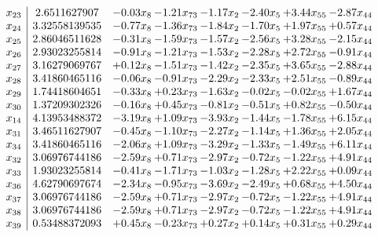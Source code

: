 \documentclass[8pt]{article}
\begin{document}
\[\begin{array}{c| c c@{\hskip 2pt} c@{\hskip 2pt} c@{\hskip 2pt} c@{\hskip 2pt} c@{\hskip 2pt} c@{\hskip 2pt} }
 x_{23}   &  2.6511627907 & -0.03 x_{8} & -1.21 x_{73} & -1.17 x_{2} & -2.40 x_{5} & +  3.44 x_{55} & -2.87 x_{44}\\
 x_{24}   &  3.32558139535 & -0.77 x_{8} & -1.36 x_{73} & -1.84 x_{2} & -1.70 x_{5} & +  1.97 x_{55} & +  0.57 x_{44}\\
 x_{25}   &  2.86046511628 & -0.31 x_{8} & -1.59 x_{73} & -1.57 x_{2} & -2.56 x_{5} & +  3.28 x_{55} & -2.15 x_{44}\\
 x_{26}   &  2.93023255814 & -0.91 x_{8} & -1.21 x_{73} & -1.53 x_{2} & -2.28 x_{5} & +  2.72 x_{55} & -0.91 x_{44}\\
 x_{27}   &  3.16279069767 & +  0.12 x_{8} & -1.51 x_{73} & -1.42 x_{2} & -2.35 x_{5} & +  3.65 x_{55} & -2.88 x_{44}\\
 x_{28}   &  3.41860465116 & -0.06 x_{8} & -0.91 x_{73} & -2.29 x_{2} & -2.33 x_{5} & +  2.51 x_{55} & -0.89 x_{44}\\
 x_{29}   &  1.74418604651 & -0.33 x_{8} & +  0.23 x_{73} & -1.63 x_{2} & -0.02 x_{5} & -0.02 x_{55} & +  1.67 x_{44}\\
 x_{30}   &  1.37209302326 & -0.16 x_{8} & +  0.45 x_{73} & -0.81 x_{2} & -0.51 x_{5} & +  0.82 x_{55} & -0.50 x_{44}\\
 x_{14}   &  4.13953488372 & -3.19 x_{8} & +  1.09 x_{73} & -3.93 x_{2} & -1.44 x_{5} & -1.78 x_{55} & +  6.15 x_{44}\\
 x_{31}   &  3.46511627907 & -0.45 x_{8} & -1.10 x_{73} & -2.27 x_{2} & -1.14 x_{5} & +  1.36 x_{55} & +  2.05 x_{44}\\
 x_{34}   &  3.41860465116 & -2.06 x_{8} & +  1.09 x_{73} & -3.29 x_{2} & -1.33 x_{5} & -1.49 x_{55} & +  6.11 x_{44}\\
 x_{32}   &  3.06976744186 & -2.59 x_{8} & +  0.71 x_{73} & -2.97 x_{2} & -0.72 x_{5} & -1.22 x_{55} & +  4.91 x_{44}\\
 x_{33}   &  1.93023255814 & -0.41 x_{8} & -1.71 x_{73} & -1.03 x_{2} & -1.28 x_{5} & +  2.22 x_{55} & +  0.09 x_{44}\\
 x_{36}   &  4.62790697674 & -2.34 x_{8} & -0.95 x_{73} & -3.69 x_{2} & -2.49 x_{5} & +  0.68 x_{55} & +  4.50 x_{44}\\
 x_{37}   &  3.06976744186 & -2.59 x_{8} & +  0.71 x_{73} & -2.97 x_{2} & -0.72 x_{5} & -1.22 x_{55} & +  4.91 x_{44}\\
 x_{38}   &  3.06976744186 & -2.59 x_{8} & +  0.71 x_{73} & -2.97 x_{2} & -0.72 x_{5} & -1.22 x_{55} & +  4.91 x_{44}\\
 x_{39}   &  0.53488372093 & +  0.45 x_{8} & -0.23 x_{73} & +  0.27 x_{2} & +  0.14 x_{5} & +  0.31 x_{55} & +  0.29 x_{44}\\

\end{array}\]
\end{document}
